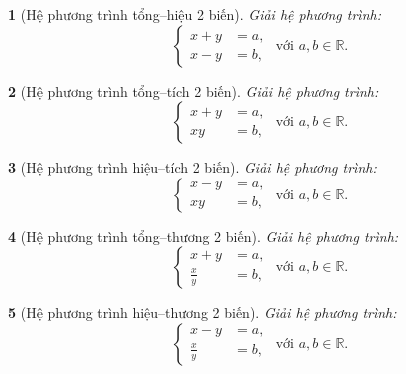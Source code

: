 \documentclass{article}
\newtheorem{baitoan}{}
\begin{document}
\begin{baitoan}[Hệ phương trình tổng--hiệu 2 biến]
	Giải hệ phương trình:
	\begin{equation}
		\left\{\begin{split}
			x + y &= a,\\
			x - y &= b,
		\end{split}\right.\mbox{ với }	a,b\in\mathbb{R}.
	\end{equation}
\end{baitoan}

\begin{baitoan}[Hệ phương trình tổng--tích 2 biến]
	Giải hệ phương trình:
	\begin{equation}
		\left\{\begin{split}
			x + y &= a,\\
			xy &= b,
		\end{split}\right.\mbox{ với }	a,b\in\mathbb{R}.	
	\end{equation}
\end{baitoan}

\begin{baitoan}[Hệ phương trình hiệu--tích 2 biến]
	Giải hệ phương trình:
	\begin{equation}
		\left\{\begin{split}
			x - y &= a,\\
			xy &= b,
		\end{split}\right.\mbox{ với }	a,b\in\mathbb{R}.	
	\end{equation}
\end{baitoan}

\begin{baitoan}[Hệ phương trình tổng--thương 2 biến]
	Giải hệ phương trình:
	\begin{equation}
		\left\{\begin{split}
			x + y &= a,\\
			\frac{x}{y} &= b,
		\end{split}\right.\mbox{ với }	a,b\in\mathbb{R}.
	\end{equation}
\end{baitoan}

\begin{baitoan}[Hệ phương trình hiệu--thương 2 biến]
	Giải hệ phương trình:
	\begin{equation}
		\left\{\begin{split}
			x - y &= a,\\
			\frac{x}{y} &= b,
		\end{split}\right.\mbox{ với }	a,b\in\mathbb{R}.
	\end{equation}
\end{baitoan}
\end{document}

